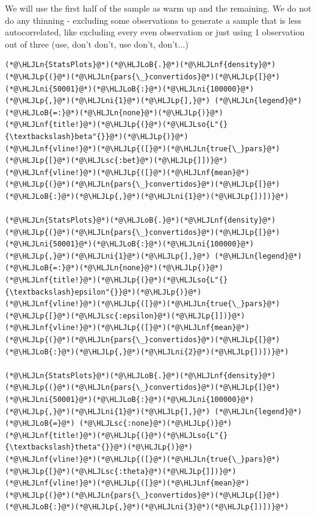 \documentclass[12pt,a4paper]{article}
\newcommand{\HLJLn}[1]{#1}
\newcommand{\HLJLnf}[1]{\textcolor[RGB]{66,102,213}{#1}}
\newcommand{\HLJLsc}[1]{\textcolor[RGB]{201,61,57}{#1}}
\newcommand{\HLJLso}[1]{\textcolor[RGB]{201,61,57}{#1}}
\newcommand{\HLJLni}[1]{\textcolor[RGB]{59,151,46}{#1}}
\newcommand{\HLJLoB}[1]{\textcolor[RGB]{102,102,102}{\textbf{#1}}}
\newcommand{\HLJLp}[1]{#1}
\begin{document}
We will use the first half of the sample as warm up and the remaining. We do not do any thinning - excluding some observations to generate a sample that is less autocorrelated, like excluding every even observation or just using 1 observation out of three (use, don't don't, use don't, don't...)


\begin{lstlisting}
(*@\HLJLn{StatsPlots}@*)(*@\HLJLoB{.}@*)(*@\HLJLnf{density}@*)(*@\HLJLp{(}@*)(*@\HLJLn{pars{\_}convertidos}@*)(*@\HLJLp{[}@*)(*@\HLJLni{50001}@*)(*@\HLJLoB{:}@*)(*@\HLJLni{100000}@*)(*@\HLJLp{,}@*)(*@\HLJLni{1}@*)(*@\HLJLp{],}@*) (*@\HLJLn{legend}@*) (*@\HLJLoB{=:}@*)(*@\HLJLn{none}@*)(*@\HLJLp{)}@*)
(*@\HLJLnf{title!}@*)(*@\HLJLp{(}@*)(*@\HLJLso{L"{}{\textbackslash}beta"{}}@*)(*@\HLJLp{)}@*)
(*@\HLJLnf{vline!}@*)(*@\HLJLp{([}@*)(*@\HLJLn{true{\_}pars}@*)(*@\HLJLp{[}@*)(*@\HLJLsc{:bet}@*)(*@\HLJLp{]])}@*)
(*@\HLJLnf{vline!}@*)(*@\HLJLp{([}@*)(*@\HLJLnf{mean}@*)(*@\HLJLp{(}@*)(*@\HLJLn{pars{\_}convertidos}@*)(*@\HLJLp{[}@*)(*@\HLJLoB{:}@*)(*@\HLJLp{,}@*)(*@\HLJLni{1}@*)(*@\HLJLp{])])}@*)

(*@\HLJLn{StatsPlots}@*)(*@\HLJLoB{.}@*)(*@\HLJLnf{density}@*)(*@\HLJLp{(}@*)(*@\HLJLn{pars{\_}convertidos}@*)(*@\HLJLp{[}@*)(*@\HLJLni{50001}@*)(*@\HLJLoB{:}@*)(*@\HLJLni{100000}@*)(*@\HLJLp{,}@*)(*@\HLJLni{1}@*)(*@\HLJLp{],}@*) (*@\HLJLn{legend}@*) (*@\HLJLoB{=:}@*)(*@\HLJLn{none}@*)(*@\HLJLp{)}@*)
(*@\HLJLnf{title!}@*)(*@\HLJLp{(}@*)(*@\HLJLso{L"{}{\textbackslash}epsilon"{}}@*)(*@\HLJLp{)}@*)
(*@\HLJLnf{vline!}@*)(*@\HLJLp{([}@*)(*@\HLJLn{true{\_}pars}@*)(*@\HLJLp{[}@*)(*@\HLJLsc{:epsilon}@*)(*@\HLJLp{]])}@*)
(*@\HLJLnf{vline!}@*)(*@\HLJLp{([}@*)(*@\HLJLnf{mean}@*)(*@\HLJLp{(}@*)(*@\HLJLn{pars{\_}convertidos}@*)(*@\HLJLp{[}@*)(*@\HLJLoB{:}@*)(*@\HLJLp{,}@*)(*@\HLJLni{2}@*)(*@\HLJLp{])])}@*)

(*@\HLJLn{StatsPlots}@*)(*@\HLJLoB{.}@*)(*@\HLJLnf{density}@*)(*@\HLJLp{(}@*)(*@\HLJLn{pars{\_}convertidos}@*)(*@\HLJLp{[}@*)(*@\HLJLni{50001}@*)(*@\HLJLoB{:}@*)(*@\HLJLni{100000}@*)(*@\HLJLp{,}@*)(*@\HLJLni{1}@*)(*@\HLJLp{],}@*) (*@\HLJLn{legend}@*) (*@\HLJLoB{=}@*) (*@\HLJLsc{:none}@*)(*@\HLJLp{)}@*)
(*@\HLJLnf{title!}@*)(*@\HLJLp{(}@*)(*@\HLJLso{L"{}{\textbackslash}theta"{}}@*)(*@\HLJLp{)}@*)
(*@\HLJLnf{vline!}@*)(*@\HLJLp{([}@*)(*@\HLJLn{true{\_}pars}@*)(*@\HLJLp{[}@*)(*@\HLJLsc{:theta}@*)(*@\HLJLp{]])}@*)
(*@\HLJLnf{vline!}@*)(*@\HLJLp{([}@*)(*@\HLJLnf{mean}@*)(*@\HLJLp{(}@*)(*@\HLJLn{pars{\_}convertidos}@*)(*@\HLJLp{[}@*)(*@\HLJLoB{:}@*)(*@\HLJLp{,}@*)(*@\HLJLni{3}@*)(*@\HLJLp{])])}@*)


\end{lstlisting}
\end{document}

